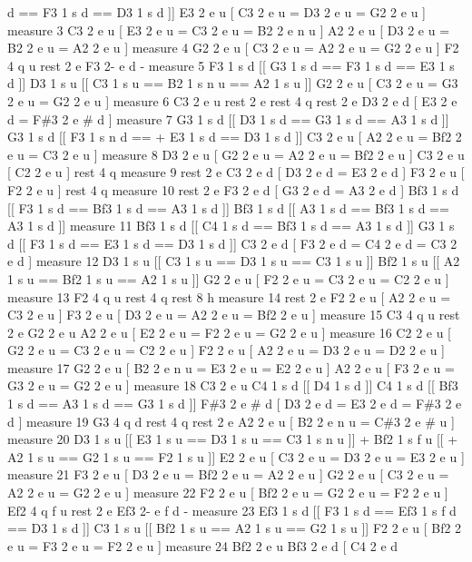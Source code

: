 d == F3 1 s d == D3 1 s d \mbox{]}\mbox{]} E3 2 e u \mbox{[} C3 2 e u = D3 2 e u = G2 2 e u \mbox{]} measure 3 C3 2 e u \mbox{[} E3 2 e u = C3 2 e u = B2 2 e n u \mbox{]} A2 2 e u \mbox{[} D3 2 e u = B2 2 e u = A2 2 e u \mbox{]} measure 4 G2 2 e u \mbox{[} C3 2 e u = A2 2 e u = G2 2 e u \mbox{]} F2 4 q u rest 2 e F3 2-\/ e d -\/ measure 5 F3 1 s d \mbox{[}\mbox{[} G3 1 s d == F3 1 s d == E3 1 s d \mbox{]}\mbox{]} D3 1 s u \mbox{[}\mbox{[} C3 1 s u == B2 1 s n u == A2 1 s u \mbox{]}\mbox{]} G2 2 e u \mbox{[} C3 2 e u = G3 2 e u = G2 2 e u \mbox{]} measure 6 C3 2 e u rest 2 e rest 4 q rest 2 e D3 2 e d \mbox{[} E3 2 e d = F\#3 2 e \# d \mbox{]} measure 7 G3 1 s d \mbox{[}\mbox{[} D3 1 s d == G3 1 s d == A3 1 s d \mbox{]}\mbox{]} G3 1 s d \mbox{[}\mbox{[} F3 1 s n d == + E3 1 s d == D3 1 s d \mbox{]}\mbox{]} C3 2 e u \mbox{[} A2 2 e u = Bf2 2 e u = C3 2 e u \mbox{]} measure 8 D3 2 e u \mbox{[} G2 2 e u = A2 2 e u = Bf2 2 e u \mbox{]} C3 2 e u \mbox{[} C2 2 e u \mbox{]} rest 4 q measure 9 rest 2 e C3 2 e d \mbox{[} D3 2 e d = E3 2 e d \mbox{]} F3 2 e u \mbox{[} F2 2 e u \mbox{]} rest 4 q measure 10 rest 2 e F3 2 e d \mbox{[} G3 2 e d = A3 2 e d \mbox{]} Bf3 1 s d \mbox{[}\mbox{[} F3 1 s d == Bf3 1 s d == A3 1 s d \mbox{]}\mbox{]} Bf3 1 s d \mbox{[}\mbox{[} A3 1 s d == Bf3 1 s d == A3 1 s d \mbox{]}\mbox{]} measure 11 Bf3 1 s d \mbox{[}\mbox{[} C4 1 s d == Bf3 1 s d == A3 1 s d \mbox{]}\mbox{]} G3 1 s d \mbox{[}\mbox{[} F3 1 s d == E3 1 s d == D3 1 s d \mbox{]}\mbox{]} C3 2 e d \mbox{[} F3 2 e d = C4 2 e d = C3 2 e d \mbox{]} measure 12 D3 1 s u \mbox{[}\mbox{[} C3 1 s u == D3 1 s u == C3 1 s u \mbox{]}\mbox{]} Bf2 1 s u \mbox{[}\mbox{[} A2 1 s u == Bf2 1 s u == A2 1 s u \mbox{]}\mbox{]} G2 2 e u \mbox{[} F2 2 e u = C3 2 e u = C2 2 e u \mbox{]} measure 13 F2 4 q u rest 4 q rest 8 h measure 14 rest 2 e F2 2 e u \mbox{[} A2 2 e u = C3 2 e u \mbox{]} F3 2 e u \mbox{[} D3 2 e u = A2 2 e u = Bf2 2 e u \mbox{]} measure 15 C3 4 q u rest 2 e G2 2 e u A2 2 e u \mbox{[} E2 2 e u = F2 2 e u = G2 2 e u \mbox{]} measure 16 C2 2 e u \mbox{[} G2 2 e u = C3 2 e u = C2 2 e u \mbox{]} F2 2 e u \mbox{[} A2 2 e u = D3 2 e u = D2 2 e u \mbox{]} measure 17 G2 2 e u \mbox{[} B2 2 e n u = E3 2 e u = E2 2 e u \mbox{]} A2 2 e u \mbox{[} F3 2 e u = G3 2 e u = G2 2 e u \mbox{]} measure 18 C3 2 e u C4 1 s d \mbox{[}\mbox{[} D4 1 s d \mbox{]}\mbox{]} C4 1 s d \mbox{[}\mbox{[} Bf3 1 s d == A3 1 s d == G3 1 s d \mbox{]}\mbox{]} F\#3 2 e \# d \mbox{[} D3 2 e d = E3 2 e d = F\#3 2 e d \mbox{]} measure 19 G3 4 q d rest 4 q rest 2 e A2 2 e u \mbox{[} B2 2 e n u = C\#3 2 e \# u \mbox{]} measure 20 D3 1 s u \mbox{[}\mbox{[} E3 1 s u == D3 1 s u == C3 1 s n u \mbox{]}\mbox{]} + Bf2 1 s f u \mbox{[}\mbox{[} + A2 1 s u == G2 1 s u == F2 1 s u \mbox{]}\mbox{]} E2 2 e u \mbox{[} C3 2 e u = D3 2 e u = E3 2 e u \mbox{]} measure 21 F3 2 e u \mbox{[} D3 2 e u = Bf2 2 e u = A2 2 e u \mbox{]} G2 2 e u \mbox{[} C3 2 e u = A2 2 e u = G2 2 e u \mbox{]} measure 22 F2 2 e u \mbox{[} Bf2 2 e u = G2 2 e u = F2 2 e u \mbox{]} Ef2 4 q f u rest 2 e Ef3 2-\/ e f d -\/ measure 23 Ef3 1 s d \mbox{[}\mbox{[} F3 1 s d == Ef3 1 s f d == D3 1 s d \mbox{]}\mbox{]} C3 1 s u \mbox{[}\mbox{[} Bf2 1 s u == A2 1 s u == G2 1 s u \mbox{]}\mbox{]} F2 2 e u \mbox{[} Bf2 2 e u = F3 2 e u = F2 2 e u \mbox{]} measure 24 Bf2 2 e u Bf3 2 e d \mbox{[} C4 2 e d 